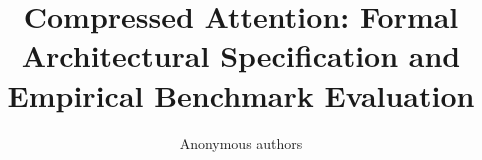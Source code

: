 \title{\textbf{Compressed Attention: Formal Architectural Specification and Empirical Benchmark Evaluation}}

\author{Anonymous authors}
